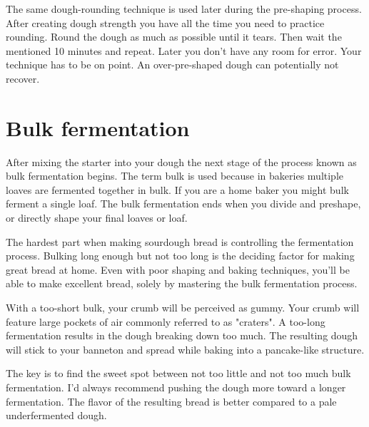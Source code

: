 The same dough-rounding technique is used later during
the pre-shaping process. After creating dough strength you
have all the time you need to practice rounding. Round the dough
as much as possible until it tears. Then wait the mentioned 10 minutes and repeat.
Later you don't have any room for error. Your technique has to be on point.
An over-pre-shaped dough can potentially not recover.


\section{Bulk fermentation}

After mixing the starter into your dough the next stage of
the process known as bulk fermentation begins. The term
bulk is used because in bakeries multiple loaves are fermented
together in bulk. If you are a home baker you might bulk
ferment a single loaf. The bulk fermentation ends when you
divide and preshape, or directly shape your final loaves or loaf.

The hardest part when making sourdough bread is controlling
the fermentation process. Bulking long enough but not too
long is the deciding factor for making great bread at home.
Even with poor shaping and baking techniques, you'll be able
to make excellent bread, solely by mastering the bulk
fermentation process.

With a too-short bulk, your crumb will be
perceived as gummy. Your crumb will feature large pockets of
air commonly referred to as "craters". A too-long fermentation
results in the dough breaking down too much. The resulting
dough will stick to your banneton and spread while baking
into a pancake-like structure.

The key is to find the sweet spot between not too little
and not too much bulk fermentation. I'd always recommend pushing
the dough more toward a longer fermentation. The
flavor of the resulting bread is better compared to a pale
underfermented dough. 

